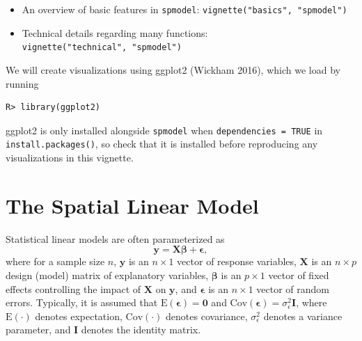 \documentclass{article}
\providecommand{\tightlist}{%
  \setlength{\itemsep}{0pt}\setlength{\parskip}{0pt}}
\begin{document}
\begin{itemize}
\tightlist
\item
  An overview of basic features in \texttt{spmodel}:
  \texttt{vignette("basics",\ "spmodel")}
\item
  Technical details regarding many functions:
  \texttt{vignette("technical",\ "spmodel")}
\end{itemize}

We will create visualizations using ggplot2 (Wickham 2016), which we
load by running

\begin{verbatim}
R> library(ggplot2)
\end{verbatim}

ggplot2 is only installed alongside \texttt{spmodel} when
\texttt{dependencies\ =\ TRUE} in \texttt{install.packages()}, so check
that it is installed before reproducing any visualizations in this
vignette.

\hypertarget{sec:theomodel}{%
\section{The Spatial Linear Model}\label{sec:theomodel}}

Statistical linear models are often parameterized as
\begin{equation}\label{eq:lm}
 \mathbf{y} = \mathbf{X} \boldsymbol{\beta} + \boldsymbol{\epsilon},
\end{equation} where for a sample size \(n\), \(\mathbf{y}\) is an
\(n \times 1\) vector of response variables, \(\mathbf{X}\) is an
\(n \times p\) design (model) matrix of explanatory variables,
\(\boldsymbol{\beta}\) is an \(p \times 1\) vector of fixed effects
controlling the impact of \(\mathbf{X}\) on \(\mathbf{y}\), and
\(\boldsymbol{\epsilon}\) is an \(n \times 1\) vector of random errors.
Typically, it is assumed that
\(\text{E}(\boldsymbol{\epsilon}) = \mathbf{0}\) and
\(\text{Cov}(\boldsymbol{\epsilon}) = \sigma^2_\epsilon \mathbf{I}\),
where \(\text{E}(\cdot)\) denotes expectation, \(\text{Cov}(\cdot)\)
denotes covariance, \(\sigma^2_\epsilon\) denotes a variance parameter,
and \(\mathbf{I}\) denotes the identity matrix.
\end{document}
